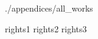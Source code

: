 
\renewcommand{\apendicename}{Appendix}
\renewcommand{\apendicesname}{Appendices}
\begin{apendicesenv}
	\partapendices{}

	{./appendices/all_works}
\end{apendicesenv}

\begin{anexosenv}
	\partanexos{}

	{rights1}
	{rights2}
	{rights3}
\end{anexosenv}

\printindex  %
